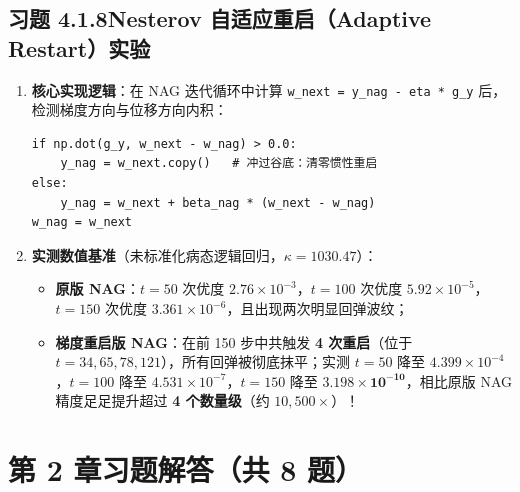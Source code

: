 \subsection*{习题 4.1.8\quad Nesterov 自适应重启（Adaptive Restart）实验}
\begin{enumerate}[label=(\arabic*), leftmargin=1.8em]
  \item \textbf{核心实现逻辑}：在 NAG 迭代循环中计算 \texttt{w\_next = y\_nag - eta * g\_y} 后，检测梯度方向与位移方向内积：
  \begin{lstlisting}
if np.dot(g_y, w_next - w_nag) > 0.0:
    y_nag = w_next.copy()   # 冲过谷底：清零惯性重启
else:
    y_nag = w_next + beta_nag * (w_next - w_nag)
w_nag = w_next
  \end{lstlisting}
  \item \textbf{实测数值基准}（未标准化病态逻辑回归，$\kappa = 1030.47$）：
  \begin{itemize}
    \item \textbf{原版 NAG}：$t=50$ 次优度 $2.76\times 10^{-3}$，$t=100$ 次优度 $5.92\times 10^{-5}$，$t=150$ 次优度 $3.361\times 10^{-6}$，且出现两次明显回弹波纹；
    \item \textbf{梯度重启版 NAG}：在前 150 步中共触发 \textbf{4 次重启}（位于 $t = 34, 65, 78, 121$），所有回弹被彻底抹平；实测 $t=50$ 降至 $4.399\times 10^{-4}$，$t=100$ 降至 $4.531\times 10^{-7}$，$t=150$ 降至 $\mathbf{3.198\times 10^{-10}}$，相比原版 NAG 精度足足提升超过 \textbf{4 个数量级}（约 $10{,}500\times$）！
  \end{itemize}
\end{enumerate}

\section*{第 2 章习题解答（共 8 题）}

